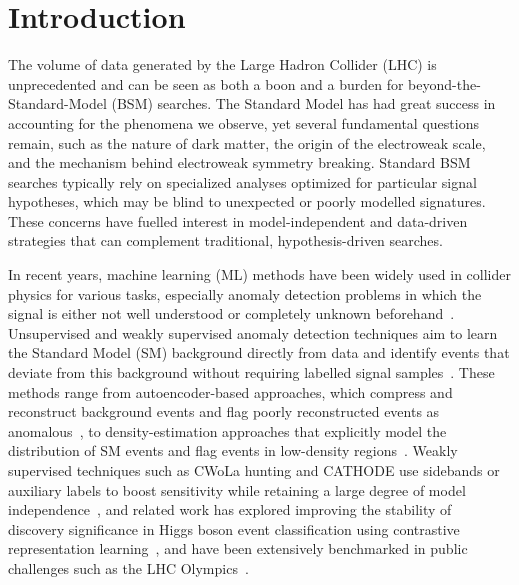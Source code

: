 \documentclass[11pt,a4paper,twocolumn]{article}
\begin{document}
\section{Introduction}

The volume of data generated by the Large Hadron Collider (LHC) is unprecedented and can be seen as both a boon and a burden for beyond-the-Standard-Model (BSM) searches. The Standard Model has had great success in accounting for the phenomena we observe, yet several fundamental questions remain, such as the nature of dark matter, the origin of the electroweak scale, and the mechanism behind electroweak symmetry breaking. Standard BSM searches typically rely on specialized analyses optimized for particular signal hypotheses, which may be blind to unexpected or poorly modelled signatures. These concerns have fuelled interest in model-independent and data-driven strategies that can complement traditional, hypothesis-driven searches.

In recent years, machine learning (ML) methods have been widely used in collider physics for various tasks, especially anomaly detection problems in which the signal is either not well understood or completely unknown beforehand~\cite{Karagiorgi2022ML}. Unsupervised and weakly supervised anomaly detection techniques aim to learn the Standard Model (SM) background directly from data and identify events that deviate from this background without requiring labelled signal samples~\cite{Nachman2020ANODE}. These methods range from autoencoder-based approaches, which compress and reconstruct background events and flag poorly reconstructed events as anomalous~\cite{Farina2020Autoencoders,Cerri2019VAE}, to density-estimation approaches that explicitly model the distribution of SM events and flag events in low-density regions~\cite{Nachman2020ANODE}. Weakly supervised techniques such as CWoLa hunting and CATHODE use sidebands or auxiliary labels to boost sensitivity while retaining a large degree of model independence~\cite{MetodievThaler2018JetTopics,Hallin2022CATHODE}, and related work has explored improving the stability of discovery significance in Higgs boson event classification using contrastive representation learning~\cite{Pujari2026Contrastive}, and have been extensively benchmarked in public challenges such as the LHC Olympics~\cite{Kasieczka2021LHCOlympics}.
\end{document}
